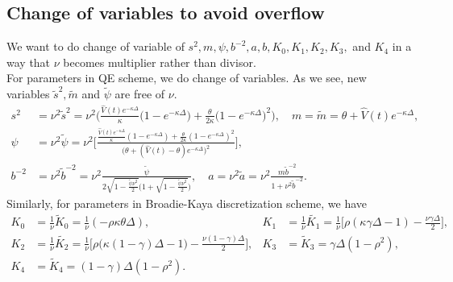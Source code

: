 \documentclass{ws-ijfe}
\begin{document}
\subsection{Change of variables to avoid overflow}
We want to do change of variable of $s^2, m, \psi, b^{-2}, a, b, K_0,K_1,K_2, K_3,$ and $ K_4$ in a way that $\nu$ becomes multiplier rather than divisor.\\
For parameters in QE scheme, we do change of variables. As we see, new variables $\tilde{s}^2, \tilde{m}$ and $\tilde{\psi}$ are free of $\nu$.
\begin{align*}
s^2&=\nu^2\tilde{s}^2={\nu}^2\bigg(\frac{\hat{V}(t)e^{-\kappa\Delta}}{\kappa}\big(1-e^{-\kappa\Delta}\big)+\frac{\theta}{2\kappa}\big(1-e^{-\kappa\Delta}\big)^2\bigg),
\quad m=\tilde{m}=\theta + \hat{V}(t)e^{-\kappa\Delta}, \\
  \psi&=\nu^2\tilde{\psi}=\nu^2\bigg[\frac{\frac{\hat{V}(t)e^{-\kappa\Delta}}{\kappa}(1-e^{-\kappa\Delta})+\frac{\theta}{2\kappa}(1-e^{-\kappa\Delta})^2}{\big(\theta+(\hat{V}(t)-\theta)e^{-\kappa\Delta}\big)^2}\bigg],\\
b^{-2}&=\nu^2\tilde{b}^{-2}=\nu^2\frac{\tilde{\psi}}{2\sqrt{1-\frac{\tilde{\psi}\nu^2}{2}}\bigg(1+\sqrt{1-\frac{\tilde{\psi}\nu^2}{2}}\bigg)} ,\quad
a=\nu^2\tilde{a}=\nu^2\frac{m\tilde{b}^{-2}}{1+\nu^2\tilde{b}^{-2}}.
\end{align*}
Similarly, for parameters in Broadie-Kaya discretization scheme, we have
\begin{align*}
   K_0&=\frac{1}{\nu}\tilde{K}_0 =\frac{1}{\nu}(-\rho\kappa\theta\Delta),&   K_1&=\frac{1}{\nu}\tilde{K_1}=\frac{1}{\nu}\bigg[\rho(\kappa\gamma\Delta-1)-\frac{\nu\gamma\Delta}{2}\bigg],\\  K_2&=\frac{1}{\nu}\tilde{K_2}=\frac{1}{\nu}\bigg[\rho\big(\kappa(1-\gamma)\Delta-1\big)-\frac{\nu(1-\gamma)\Delta}{2}\bigg], &
   K_3&=\tilde{K}_3=\gamma\Delta(1-\rho^2),\\ K_4&=\tilde{K}_4=(1-\gamma)\Delta(1-\rho^2).
\end{align*}
\end{document}
